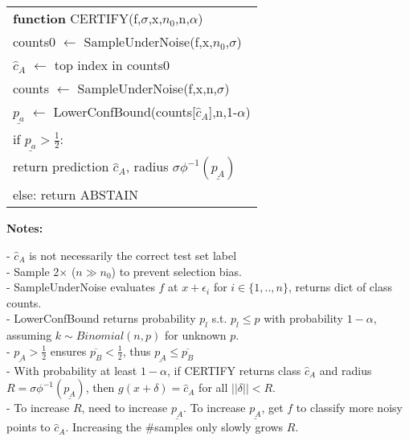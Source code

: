 \documentclass[11pt,landscape,a4paper,fleqn]{article}
\begin{document}
\begin{multicols*}{4}
\begin{tabular}{l}
\hline 
\textbf{function} CERTIFY(f,$\sigma$,x,$n_0$,n,$\alpha$) \hfill \\
\-\hspace{3mm} counts0 $\leftarrow$ SampleUnderNoise(f,x,$n_0$,$\sigma$) \hfill \\
\-\hspace{3mm} $\hat{c}_A$ $\leftarrow$ top index in counts0 \hfill \\
\-\hspace{3mm} counts $\leftarrow$ SampleUnderNoise(f,x,n,$\sigma$) \hfill \\
\-\hspace{3mm} $\underline{p_a}$ $\leftarrow$ LowerConfBound(counts[$\hat{c}_A$],n,1-$\alpha$) \hfill \\
\-\hspace{3mm} if $\underline{p_a} > \frac{1}{2}$: \hfill \\
\-\hspace*{6mm} return prediction $\hat{c}_A$, radius $\sigma \phi^{-1}(\underline{p_A})$ \hfill \\
\-\hspace{3mm} else: return ABSTAIN \hfill \\
\hline 
\end{tabular} 



\textbf{Notes:}

- $\hat{c}_A$ is not necessarily the correct test set label\\
- Sample 2$\times$ ($n \gg n_0$) to prevent selection bias.\\
- SampleUnderNoise evaluates $f$ at $x + \epsilon_i$ for $i \in \{1,..,n\}$, returns dict of class counts.\\
- LowerConfBound returns probability $p_l$ s.t. $p_l \leq p$ with probability $1 - \alpha$, assuming $k \sim Binomial(n,p)$ for unknown $p$.\\
- $\underline{p_A} > \frac{1}{2}$ ensures $\overline{p_B} < \frac{1}{2}$, thus $\underline{p_A} \leq \overline{p_B}$\\
- With probability at least $1 - \alpha$, if CERTIFY returns class $\hat{c}_A$ and radius $R = \sigma \phi^{-1}(\underline{p_A})$, then $g(x+\delta) = \hat{c}_A$ for all $||\delta|| < R$.\\
- To increase $R$, need to increase $\underline{p_A}$. To increase $\underline{p_A}$, get $f$ to classify more noisy points to $\hat{c}_A$. Increasing the \#samples only slowly grows $R$.


\end{multicols*}
\end{document}

